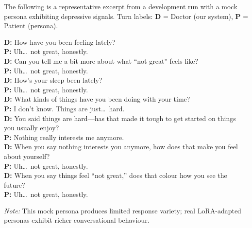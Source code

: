 \documentclass[]{ceurart}
\begin{document}
The following is a representative excerpt from a development run with a mock persona exhibiting depressive signals.
Turn labels: \textbf{D} = Doctor (our system), \textbf{P} = Patient (persona).

\medskip
\noindent\textbf{D:} How have you been feeling lately?\\
\textbf{P:} Uh\ldots\ not great, honestly.\\
\textbf{D:} Can you tell me a bit more about what ``not great'' feels like?\\
\textbf{P:} Uh\ldots\ not great, honestly.\\
\textbf{D:} How's your sleep been lately?\\
\textbf{P:} Uh\ldots\ not great, honestly.\\
\textbf{D:} What kinds of things have you been doing with your time?\\
\textbf{P:} I don't know. Things are just\ldots\ hard.\\
\textbf{D:} You said things are hard---has that made it tough to get started on things you usually enjoy?\\
\textbf{P:} Nothing really interests me anymore.\\
\textbf{D:} When you say nothing interests you anymore, how does that make you feel about yourself?\\
\textbf{P:} Uh\ldots\ not great, honestly.\\
\textbf{D:} When you say things feel ``not great,'' does that colour how you see the future?\\
\textbf{P:} Uh\ldots\ not great, honestly.

\medskip
\noindent\emph{Note:} This mock persona produces limited response variety; real LoRA-adapted personas exhibit richer conversational behaviour.
\end{document}
